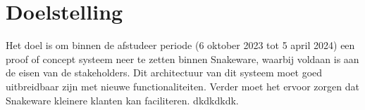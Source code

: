 \section{Doelstelling}
Het doel is om binnen de afstudeer periode (6 oktober 2023 tot 5 april 2024) een proof of concept systeem neer te zetten binnen Snakeware, waarbij voldaan is aan de eisen van de stakeholders.
Dit architectuur van dit systeem moet goed uitbreidbaar zijn met nieuwe functionaliteiten.
Verder moet het ervoor zorgen dat Snakeware kleinere klanten kan faciliteren.
dkdkdkdk.
